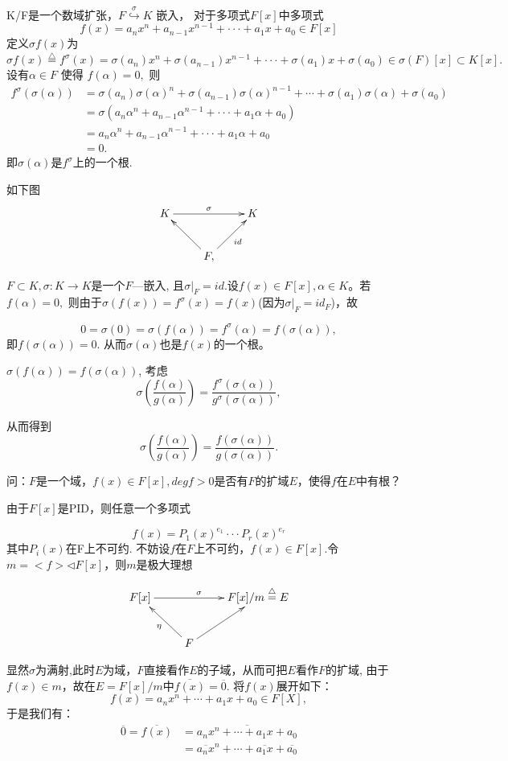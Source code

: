 \documentclass[UTF8]{article}
\begin{document}
K/F是一个数域扩张，$F\stackrel{\sigma}{\hookrightarrow} K$ 嵌入，
对于多项式$F[x]$中多项式$$
f(x)=a_nx^n+a_{n-1}x^{n-1}+\cdot\cdot\cdot+a_1x+a_0\in F[x]
$$
定义$\sigma f(x)$为
$$
\sigma f(x)\stackrel{\bigtriangleup}{=}f^{\sigma}(x)=\sigma(a_n)x^n+\sigma(a_{n-1})x^{n-1}+\cdot\cdot\cdot+\sigma(a_1)x+\sigma(a_0)\in {\sigma}(F)[x]\subset K[x].
$$
设有${\alpha}\in F$ 使得 $f({\alpha})=0,$  
则
\[
\begin{split}
f^{\sigma}({\sigma}(\alpha))&=\sigma(a_n){\sigma}(\alpha)^n+\sigma(a_{n-1}){\sigma}(\alpha)^{n-1}+\cdots+\sigma(a_1){\sigma}(\alpha)+\sigma(a_0)\\
&={\sigma}(a_n{\alpha}^n+a_{n-1}{\alpha}^{n-1}+\cdot\cdot\cdot+a_1{\alpha}+a_0)\\
&=a_n{\alpha}^n+a_{n-1}{\alpha}^{n-1}+\cdot\cdot\cdot+a_1{\alpha}+a_0\\
&=0.
\end{split}
\]
即$\sigma(\alpha)$是$f^{\sigma}$上的一个根.


如下图
$$
\xymatrix{
	K\ar[rr]^{\sigma }&&K\\& F\ar[lu]\ar[ru]_{id}, & 
}
$$

$F\subset K,\sigma:K\longrightarrow K $是一个$F—$嵌入, 且${\sigma}|_F=id$.设$f(x)\in F[x],\alpha\in K$。若$f(\alpha)=0 ,$
则由于${\sigma}(f(x))=f^{\sigma}(x)=f(x)$(因为${\sigma}|_F=id_F$)，故

$$
0=\sigma(0)={\sigma}(f(\alpha))=f^{\sigma}(\alpha)=f({\sigma}(\alpha)),
$$
即$f({\sigma}(\alpha))=0$.
从而${\sigma}(\alpha)$也是$f(x)$的一个根。

${\sigma}(f(\alpha))=f({\sigma}(\alpha))$, 考虑
$$\sigma(\frac{f({\alpha})}{g({\alpha})})=\frac{f^{\sigma}({\sigma}(\alpha))}{g^{\sigma}({\sigma}(\alpha))},$$

从而得到
$$\sigma(\frac{f({\alpha})}{g({\alpha})})=\frac{f({\sigma}(\alpha))}{g({\sigma}(\alpha))}.$$

问：$F$是一个域，$f(x)\in F[x],degf>0 $是否有$F$的扩域$E$，使得$f$在$E$中有根？

由于$ F[x]$是PID，则任意一个多项式

$$f(x)=P_1(x)^{e_1}\cdot\cdot\cdot P_r(x)^{e_r}$$
其中$P_i(x)$在F上不可约.
不妨设$f$在$F$上不可约，$f(x)\in F[x]$.令$m=<f>\lhd F[x]$，则$m$是极大理想

$$\xymatrix{F[x]\ar[rr]^{\sigma }&&{F[x]/m\stackrel{\bigtriangleup}{=}E}\\& F\ar[lu]^{\eta} \ar[ru] & }$$

显然${\sigma }$为满射,此时$E$为域，$F$直接看作$E$的子域，从而可把$E$看作$F$的扩域,
由于$f(x)\in m$，故在$E=F[x]/m$中$\overline{f(x)}=\overline{0}$.
将$f(x)$展开如下：
$$f(x)=a_nx^n+\cdots+a_1x+a_0\in F[X],$$
于是我们有：
\[
\begin{split}
\overline{0}=\overline{f(x)}&=\overline {a_nx^n+\cdots+a_1x+a_0}\\
&=\overline{a_nx}^n+\cdots+\overline{a_1x}+\overline{a_0}
\end{split}
\]
\end{document}
